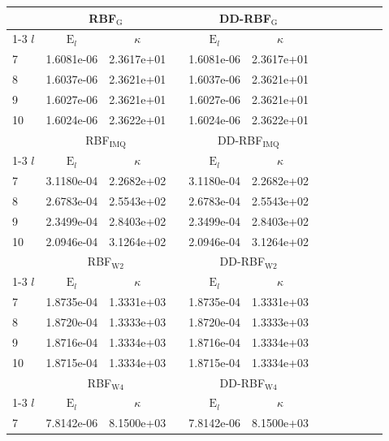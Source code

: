 \documentclass[preprint]{elsarticle}       %
\begin{document}
\begin{table}[!ht]
\begin{center}
\begin{tabular}{lccccccccccc}
& \multicolumn{2}{c}{RBF$_{\text{G}}$} & &   \multicolumn{2}{c}{DD-RBF$_{\text{G}}$}\\ \cline{1-3} \cline{5-7} $l$ & $\text{E}_l$  &$\kappa$ & &$\text{E}_l$ &  $\kappa$ \\
7 &1.6081e-06 & 2.3617e+01 && 1.6081e-06 & 2.3617e+01 && \\
8 &1.6037e-06 & 2.3621e+01 && 1.6037e-06 & 2.3621e+01 && \\
9 &1.6027e-06 & 2.3621e+01 && 1.6027e-06 & 2.3621e+01 && \\
10 &1.6024e-06 & 2.3622e+01 && 1.6024e-06 & 2.3622e+01 && \\
\hline
\hline
& \multicolumn{2}{c}{RBF$_{\text{IMQ}}$} & &   \multicolumn{2}{c}{DD-RBF$_{\text{IMQ}}$}\\ \cline{1-3} \cline{5-7} $l$ & $\text{E}_l$ & $\kappa$ & &$\text{E}_l$ & $\kappa$ \\
7 &3.1180e-04 & 2.2682e+02 && 3.1180e-04 & 2.2682e+02 && \\
8 &2.6783e-04 & 2.5543e+02 && 2.6783e-04 & 2.5543e+02 && \\
9 &2.3499e-04 & 2.8403e+02 && 2.3499e-04 & 2.8403e+02 && \\
10 &2.0946e-04 & 3.1264e+02 && 2.0946e-04 & 3.1264e+02 && \\
\hline
\hline
& \multicolumn{2}{c}{RBF$_{\text{W2}}$} & &   \multicolumn{2}{c}{DD-RBF$_{\text{W2}}$}\\ \cline{1-3} \cline{5-7} $l$ & $\text{E}_l$ & $\kappa$ & &$\text{E}_l$ & $\kappa$ \\
7 &1.8735e-04 & 1.3331e+03 && 1.8735e-04 & 1.3331e+03 && \\
8 &1.8720e-04 & 1.3333e+03 && 1.8720e-04 & 1.3333e+03 && \\
9 &1.8716e-04 & 1.3334e+03 && 1.8716e-04 & 1.3334e+03 && \\
10 &1.8715e-04 & 1.3334e+03 && 1.8715e-04 & 1.3334e+03 && \\
\hline
\hline
& \multicolumn{2}{c}{RBF$_{\text{W4}}$} & &   \multicolumn{2}{c}{DD-RBF$_{\text{W4}}$}\\ \cline{1-3} \cline{5-7} $l$ & $\text{E}_l$ & $\kappa$ & &$\text{E}_l$ & $\kappa$ \\
7 &7.8142e-06 & 8.1500e+03 && 7.8142e-06 & 8.1500e+03 && \\

\end{tabular}
\end{center}
\end{table}
\end{document}

